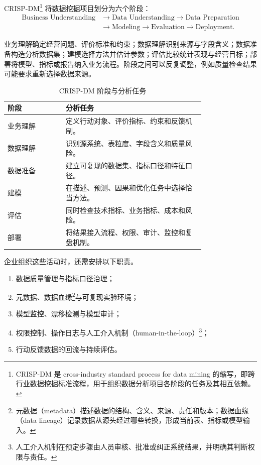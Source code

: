 CRISP-DM\footnote{CRISP-DM 是 cross-industry standard process for data mining 的缩写，即跨行业数据挖掘标准流程，用于组织数据分析项目各阶段的任务及其相互依赖。} 将数据挖掘项目划分为六个阶段：
\[
\begin{aligned}
\text{Business Understanding}
&\rightarrow
\text{Data Understanding}
\rightarrow
\text{Data Preparation}\\
&\rightarrow
\text{Modeling}
\rightarrow
\text{Evaluation}
\rightarrow
\text{Deployment}.
\end{aligned}
\]

业务理解确定经营问题、评价标准和约束；数据理解识别来源与字段含义；数据准备构造分析数据集；建模选择方法并估计参数；评估比较统计表现与经营目标；部署将模型、指标或报告纳入业务流程。阶段之间可以反复调整，例如质量检查结果可能要求重新选择数据来源。

\begin{table}[htbp]
\centering
\caption{CRISP-DM 阶段与分析任务}
\begin{tabular}{P{0.23\linewidth}P{0.55\linewidth}}
\toprule
{}
阶段 & 分析任务\\
\midrule
业务理解 & 定义行动对象、评价指标、约束和反馈机制。\\
数据理解 & 识别源系统、表粒度、字段含义和质量风险。\\
数据准备 & 建立可复现的数据集、指标口径和特征口径。\\
建模 & 在描述、预测、因果和优化任务中选择恰当方法。\\
评估 & 同时检查技术指标、业务指标、成本和风险。\\
部署 & 将结果接入流程、权限、审计、监控和复盘机制。\\
\bottomrule
\end{tabular}
\end{table}

企业组织这些活动时，还需安排以下职责。
\begin{enumerate}
  \item 数据质量管理与指标口径治理；
  \item 元数据、数据血缘\footnote{元数据（metadata）描述数据的结构、含义、来源、责任和版本；数据血缘（data lineage）记录数据从源头经过哪些转换，形成当前表、指标或模型输入。}与可复现实验环境；
  \item 模型监控、漂移检测与模型审计；
  \item 权限控制、操作日志与人工介入机制（human-in-the-loop）\footnote{人工介入机制在预定步骤由人员审核、批准或纠正系统结果，并明确其判断权限与责任。}；
  \item 行动反馈数据的回流与持续评估。
\end{enumerate}

